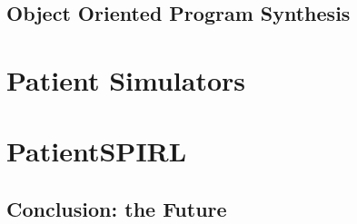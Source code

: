 \newpage
\chapter{Object Oriented Program Synthesis}
\label{ch:oops}

\part{Patient Simulators}
\label{part:simulators}

\newpage


\newpage


\newpage


\newpage


\newpage


\part{PatientSPIRL}
\label{part:patientspirl}

\newpage


\newpage
\chapter{Conclusion: the Future}
\label{ch:conclusion}


\printbibliography


